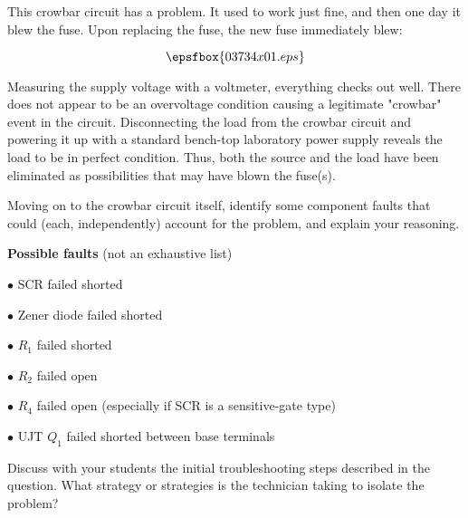 

This crowbar circuit has a problem.  It used to work just fine, and then one day it blew the fuse.  Upon replacing the fuse, the new fuse immediately blew:

$$\epsfbox{03734x01.eps}$$

Measuring the supply voltage with a voltmeter, everything checks out well.  There does not appear to be an overvoltage condition causing a legitimate "crowbar" event in the circuit.  Disconnecting the load from the crowbar circuit and powering it up with a standard bench-top laboratory power supply reveals the load to be in perfect condition.  Thus, both the source and the load have been eliminated as possibilities that may have blown the fuse(s).

Moving on to the crowbar circuit itself, identify some component faults that could (each, independently) account for the problem, and explain your reasoning.







\noindent
{\bf Possible faults} (not an exhaustive list)

\medskip
\item{$\bullet$} SCR failed shorted
\item{$\bullet$} Zener diode failed shorted 
\item{$\bullet$} $R_1$ failed shorted
\item{$\bullet$} $R_2$ failed open
\item{$\bullet$} $R_4$ failed open (especially if SCR is a sensitive-gate type)
\item{$\bullet$} UJT $Q_1$ failed shorted between base terminals
\medskip







Discuss with your students the initial troubleshooting steps described in the question.  What strategy or strategies is the technician taking to isolate the problem?




